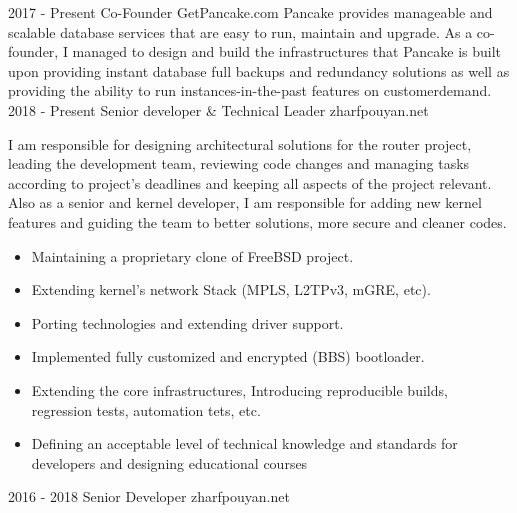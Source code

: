\documentclass[12pt]{developercv}
\begin{document}
\begin{entrylist}
	\entry
		{2017 - Present}
		{Co-Founder}
		{GetPancake.com}
		{
			Pancake provides manageable and scalable database services that
			are easy to run, maintain and upgrade. As a co-founder, I managed
			to design and build the infrastructures that Pancake is built upon
			providing instant database full backups and redundancy solutions
			as well as providing the ability to run instances-in-the-past
			features on customerdemand.
		}
	\entry
		{2018 - Present}
		{Senior developer \& Technical Leader}
		{zharfpouyan.net}
		{
		I am responsible for designing architectural solutions for the router project,
		leading the development team, reviewing code changes and managing
		tasks according to project's deadlines and keeping all aspects of
		the project relevant. Also as a senior and kernel developer,
		I am responsible for adding new kernel features and guiding the
		team to better solutions, more secure and cleaner codes.
		\begin{itemize}
			\itemsep0em
			\item Maintaining a proprietary clone of FreeBSD project.
			\item Extending kernel's network Stack (MPLS, L2TPv3, mGRE, etc).
			\item Porting technologies and extending driver support.
			\item Implemented fully customized and encrypted (BBS) bootloader.
			\item Extending the core infrastructures, Introducing reproducible builds,
			      regression tests, automation tets, etc.
			\item Defining an acceptable level of technical knowledge and standards for
			      developers and designing educational courses
		\end{itemize}
		}
	\entry
		{2016 - 2018}
		{Senior Developer}
		{zharfpouyan.net}
		{
}
\end{entrylist}
\end{document}
